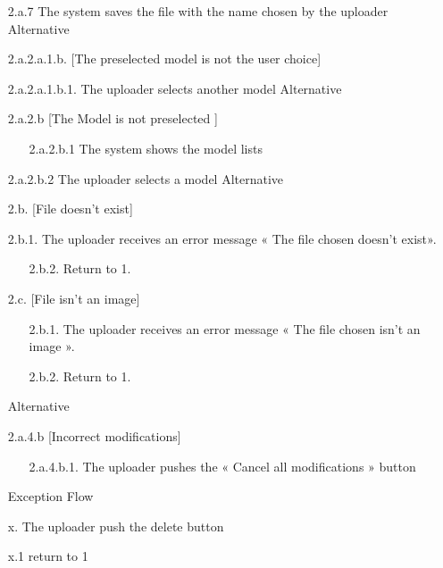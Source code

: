 \begin{enumerate}
\begin{itemize}
		\item[{2.a.7}] The system saves the file with the name chosen by the uploader
\smallbreak
		Alternative
		\item[{2.a.2.a.1.b.}] [The preselected model is not the user choice]
		\item[{2.a.2.a.1.b.1.}] The uploader selects another model
\smallbreak
		Alternative
		\item[{2.a.2.b}] [The Model is not preselected ]
		\begin{itemize}
			\item[{2.a.2.b.1}] The system shows the model lists
		\end{itemize}
		\item[{	2.a.2.b.2}] The uploader selects a model
\smallbreak
		Alternative
		\item[{2.b.}] [File doesn’t exist] 
		\item[{	2.b.1.}] The uploader receives an error message « The file chosen doesn’t exist».
		\begin{itemize}
			\item[{2.b.2.}] Return to 1.
		\end{itemize}
		\item[{2.c.}] [File isn’t an image] 
		\begin{itemize}
			\item[{2.b.1.}] The uploader receives an error message « The file chosen isn’t an image ».
			\item[{2.b.2.}] Return to 1. 
		\end{itemize}
\smallbreak
		Alternative
		\item[{2.a.4.b}] [Incorrect modifications]
		\begin{itemize}
			\item[{2.a.4.b.1.}] The uploader pushes the « Cancel all modifications » button 
		\end{itemize}
\smallbreak
		Exception Flow
		\item[{x.}] The uploader push the delete button
		\item[{x.1}] return to 1
	\end{itemize}
\end{enumerate}

	\newpage 
	
